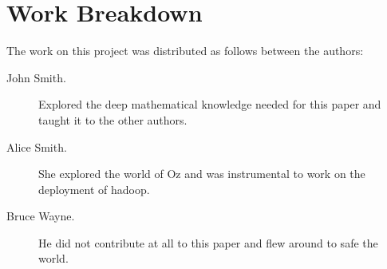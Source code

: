 \documentclass[9pt,twocolumn,twoside]{styles/osajnl}
\begin{document}
\newpage

\appendix

\section{Work Breakdown}

The work on this project was distributed as follows between the
authors:

\begin{description}

\item[John Smith.] Explored the deep mathematical knowledge needed for
  this paper and taught it to the other authors.

\item[Alice Smith.] She explored the world of Oz and was instrumental
  to work on the deployment of hadoop.

\item[Bruce Wayne.] He did not contribute at all to this paper and
  flew around to safe the world.  

\end{description}
\end{document}
